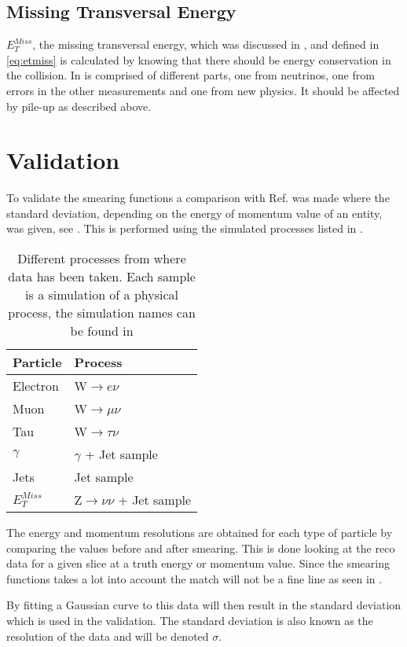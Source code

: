 \subsection{Missing Transversal Energy}
$E_T^{Miss}$, the missing transversal energy, which was discussed in , and defined in \eqref{eq:etmiss} is calculated by knowing that there should be energy conservation in the collision. In is comprised of different parts, one from neutrinos, one from errors in the other measurements and one from new physics. It should be affected by pile-up as described above.

\newpage
\section{Validation}\label{sec:vali}
To validate the smearing functions a comparison with Ref. \citep{ATL-PHYS-PUB-2013-004} was made where the standard deviation, depending on the energy of momentum value of an entity, was given, see . This is performed using the simulated processes listed in . 
\begin{SCtable}[][ht]
\begin{tabular}{|l|l|}
\hline
Particle & Process \\ \hline
Electron & W$\rightarrow e\nu$ \\
Muon & W$\rightarrow \mu \nu$ \\
Tau & W$\rightarrow \tau \nu$ \\
$\gamma$ & $\gamma$ + Jet sample \\
Jets & Jet sample \\
$E_T^{Miss}$ & Z$\rightarrow \nu \nu$ + Jet sample \\ \hline
\end{tabular}
\caption{Different processes from where data has been taken. Each sample is a simulation of a physical process, the simulation names can be found in }
\label{tab:backproc}
\end{SCtable}

The energy and momentum resolutions are obtained for each type of particle by comparing the values before and after smearing.
This is done looking at the reco data for a given slice at a truth energy or momentum value. Since the smearing functions takes a lot into account the match will not be a fine line as seen in .

By fitting a Gaussian curve to this data will then result in the standard deviation which is used in the validation. The standard deviation is also known as the resolution of the data and will be denoted $\sigma$.

